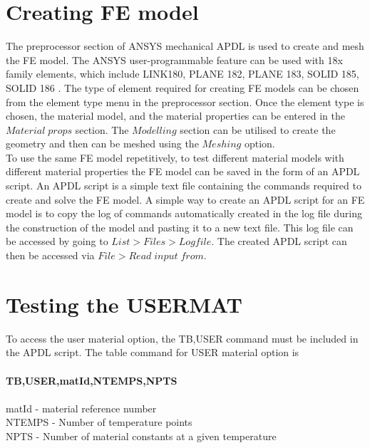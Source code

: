 \documentclass[12pt,a4paper,twoside,openright]{report}
\begin{document}
\section{Creating FE model}
\indent\indent\indent  The preprocessor section of ANSYS mechanical APDL is used to create and mesh the FE model. The ANSYS user-programmable feature can be used with 18x family elements, which include LINK180, PLANE 182, PLANE 183, SOLID 185, SOLID 186 \citep{lin1999ansys}. The type of element required for creating FE models can be chosen from the element type menu in the preprocessor section. Once the element type is chosen, the material model, and the material properties can be entered in the $Material\; props$ section.  The $Modelling$ section can be utilised to create the geometry and then can be meshed using the $Meshing$ option.\\ \indent\indent\indent To use the same FE model repetitively, to test different material models with different material properties the FE model can be saved in the form of an APDL script.  An APDL script is a simple text file containing the commands required to create and solve the FE model. A simple way to create an APDL script for an FE model is to copy the log of commands automatically created in the log file during the construction of the model and pasting it to a new text file. This log file can be accessed by going to $List>Files>Logfile$. The created APDL script can then be accessed via $File>Read \;input\; from$.

\section{Testing the USERMAT}
\indent\indent\indent  To access the user material option, the TB,USER command must be included in the APDL script. The table command for USER material option is\\
\\
\textbf{TB,USER,matId,NTEMPS,NPTS \citep{lin1999ansys}}
\\
\\
\indent matId - material reference number
\\
\indent NTEMPS - Number of temperature points 
\\
\indent NPTS  -  Number of material constants at a given temperature
\\
\end{document}
